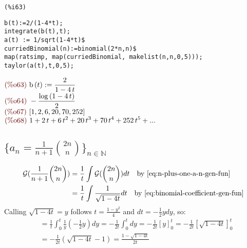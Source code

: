 \noindent
\begin{minipage}[t]{8ex}{\color{red}\bf
\begin{verbatim}
(%i63) 
\end{verbatim}}
\end{minipage}
\begin{minipage}[t]{\textwidth}{\color{blue}
\begin{verbatim}
b(t):=2/(1-4*t);
integrate(b(t),t);
a(t) := 1/sqrt(1-4*t)$
curriedBinomial(n):=binomial(2*n,n)$
map(ratsimp, map(curriedBinomial, makelist(n,n,0,5)));
taylor(a(t),t,0,5);
\end{verbatim}}
\end{minipage}
\begin{math}\displaystyle
\parbox{8ex}{\color{labelcolor}(\%o63) }
\mathrm{b}\left( t\right) :=\frac{2}{1-4\,t}
\end{math}\\
\begin{math}\displaystyle
\parbox{8ex}{\color{labelcolor}(\%o64) }
-\frac{\mathrm{log}\left( 1-4\,t\right) }{2}
\end{math}\\
\begin{math}\displaystyle
\parbox{8ex}{\color{labelcolor}(\%o67) }
[1,2,6,20,70,252]
\end{math}\\
\begin{math}\displaystyle
\parbox{8ex}{\color{labelcolor}(\%o68) }
1+2\,t+6\,{t}^{2}+20\,{t}^{3}+70\,{t}^{4}+252\,{t}^{5}+...
\end{math}

\subsection{$\{a_n = \frac{1}{n+1} {{2n}\choose{n}} \}_{n \in
    \mathbb{N} }$}

\begin{displaymath}
  \begin{split}
    \mathcal{G} ( \frac{1}{n+1} {{2n}\choose{n}}) &= \frac{1}{t}
    \int{\mathcal{G} ({{2n}\choose{n}} )dt} \quad \text{by \autoref{eq:n-plus-one-a-n-gen-fun}}\\
    &= \frac{1}{t} \int{ \frac{1}{\sqrt{1-4t}} dt} \quad \text{by
      \autoref{eq:binomial-coefficient-gen-fun}}
  \end{split}
\end{displaymath}
Calling $\sqrt{1-4t} = y$ follows $t = \frac{1-y^2}{4} $ and $dt = -
\frac{1}{2}y dy $, so:
\begin{displaymath}
  \begin{split}
    &= \frac{1}{t} \int_0^t{ \frac{1}{y}\left( - \frac{1}{2}y\right)
      dy} = -\frac{1}{2t} \int_0^t{ dy} = -\frac{1}{2t}
    \left[y\right]_0^t = -\frac{1}{2t} \left[\sqrt{1-4t}\right]_0^t\\
    &= -\frac{1}{2t}(\sqrt{1-4t} - 1) = \frac{1- \sqrt{1-4t}}{2t}
  \end{split}
\end{displaymath}

